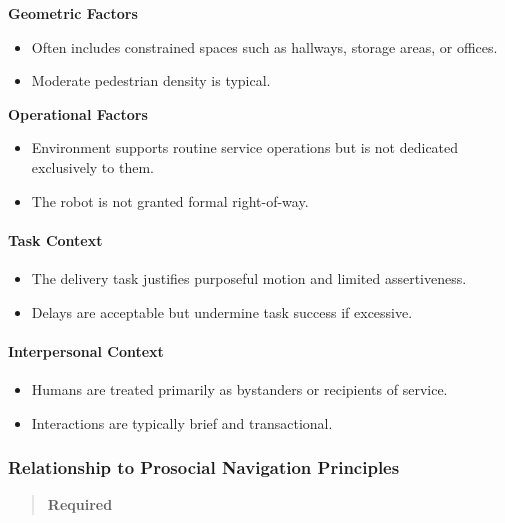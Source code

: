\documentclass[utf8]{frontiers_suppmat} %
\providecommand{\tightlist}{%
  \setlength{\itemsep}{0pt}\setlength{\parskip}{0pt}}
\begin{document}
\textbf{Geometric Factors}

\begin{itemize}
\tightlist
\item
  Often includes constrained spaces such as hallways, storage areas, or
  offices.
\item
  Moderate pedestrian density is typical.
\end{itemize}

\textbf{Operational Factors}

\begin{itemize}
\tightlist
\item
  Environment supports routine service operations but is not dedicated
  exclusively to them.
\item
  The robot is not granted formal right-of-way.
\end{itemize}

\paragraph{Task Context}\label{task-context}

\begin{itemize}
\tightlist
\item
  The delivery task justifies purposeful motion and limited
  assertiveness.
\item
  Delays are acceptable but undermine task success if excessive.
\end{itemize}

\paragraph{Interpersonal Context}\label{interpersonal-context}

\begin{itemize}
\tightlist
\item
  Humans are treated primarily as bystanders or recipients of service.
\item
  Interactions are typically brief and transactional.
\end{itemize}

\subsubsection{Relationship to Prosocial Navigation
Principles}\label{relationship-to-prosocial-navigation-principles}

\begin{quote}
\textbf{Required}
\end{quote}
\end{document}
